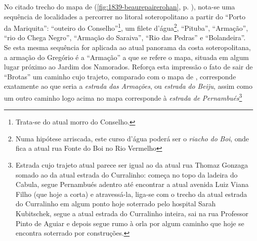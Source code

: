 
No citado trecho do mapa de  (\autoref{fig:1839-beaurepairerohan}, p. \pageref{fig:1839-beaurepairerohan}), nota-se uma sequência de localidades a percorrer no litoral soteropolitano a partir do ``Porto da Mariquita'': ``outeiro do Conselho''\footnote{Trata-se do atual morro do Conselho.}, um filete d'água\footnote{Numa hipótese arriscada, este curso d'água poderá ser o \textit{riacho do Boi}, onde fica a atual rua Fonte do Boi no Rio Vermelho}, ``Pituba'', ``Armação'', ``rio do Chega Negro'', ``Armação do Saraiva'', ``Rio das Pedras'' e ``Bolandeira''. Se esta mesma sequência for aplicada ao atual panorama da costa soteropolitana, a armação do Gregório é a ``Armação'' a que se refere o mapa, situada em algum lugar próximo ao Jardim dos Namorados. Reforça esta impressão o fato de sair de ``Brotas'' um caminho cujo trajeto, comparado com o mapa de , corresponde exatamente ao que seria a \textit{estrada das Armações}, ou \textit{estrada do Beiju}, assim como um outro caminho logo acima no mapa corresponde à \textit{estrada de Pernambués}\footnote{Estrada cujo trajeto atual parece ser igual ao da atual rua Thomaz Gonzaga somado ao da atual estrada do Curralinho: começa no topo da ladeira do Cabula, segue Pernambués adentro até encontrar a atual avenida Luiz Viana Filho (que hoje a corta) e atravessá-la, liga-se com o trecho da atual estrada do Curralinho em algum ponto hoje soterrado pelo hospital Sarah Kubitschek, segue a atual estrada do Curralinho inteira, sai na rua Professor Pinto de Aguiar e depois segue rumo à orla por algum caminho que hoje se encontra soterrado por construções.}